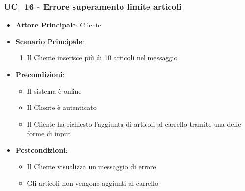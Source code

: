 \subsubsection{UC\_16 - Errore superamento limite articoli}
\label{uc_16}

\begin{itemize}
    \item \textbf{Attore Principale}: Cliente
    \item \textbf{Scenario Principale}:
    \begin{enumerate}
        \item Il Cliente inserisce più di 10 articoli nel messaggio
    \end{enumerate}
    \item \textbf{Precondizioni}:
        \begin{itemize}
            \item Il sistema è online
            \item Il Cliente è autenticato
            \item Il Cliente ha richiesto l'aggiunta di articoli al carrello tramite una delle forme di input
        \end{itemize}
	\item \textbf{Postcondizioni}:
        \begin{itemize}
            \item Il Cliente visualizza un messaggio di errore
            \item Gli articoli non vengono aggiunti al carrello
        \end{itemize}
\end{itemize}